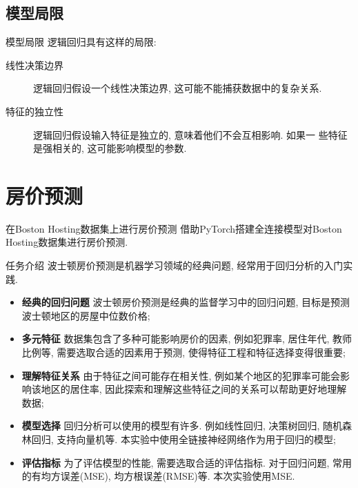 \documentclass{beamer}
\begin{document}
\subsection{模型局限}
\begin{frame}[fragile]{模型局限}
	逻辑回归具有这样的局限:
	\begin{description}
		\item[线性决策边界] 逻辑回归假设一个线性决策边界, 这可能不能捕获数据中的复杂关系.
		\item[特征的独立性] 逻辑回归假设输入特征是独立的, 意味着他们不会互相影响. 如果一
			些特征是强相关的, 这可能影响模型的参数.
	\end{description}
\end{frame}

\section{房价预测}
\begin{frame}[fragile]{在Boston Hosting数据集上进行房价预测}
	借助PyTorch搭建全连接模型对Boston Hosting数据集进行房价预测.
\end{frame}

\begin{frame}[fragile]{任务介绍}
	波士顿房价预测是机器学习领域的经典问题, 经常用于回归分析的入门实践.

	\begin{itemize}
		\item \textbf{经典的回归问题} 波士顿房价预测是经典的监督学习中的回归问题, 目标是预测波士顿地区的房屋中位数价格;
		\item \textbf{多元特征} 数据集包含了多种可能影响房价的因素, 例如犯罪率, 居住年代, 教师比例等, 需要选取合适的因素用于预测, 使得特征工程和特征选择变得很重要;
		\item \textbf{理解特征关系} 由于特征之间可能存在相关性, 例如某个地区的犯罪率可能会影响该地区的居住率, 因此探索和理解这些特征之间的关系可以帮助更好地理解数据;
		\item \textbf{模型选择} 回归分析可以使用的模型有许多. 例如线性回归, 决策树回归, 随机森林回归, 支持向量机等. 本实验中使用全链接神经网络作为用于回归的模型;
		\item \textbf{评估指标} 为了评估模型的性能, 需要选取合适的评估指标. 对于回归问题, 常用的有均方误差(MSE), 均方根误差(RMSE)等. 本次实验使用MSE.
	\end{itemize}
\end{frame}
\end{document}
